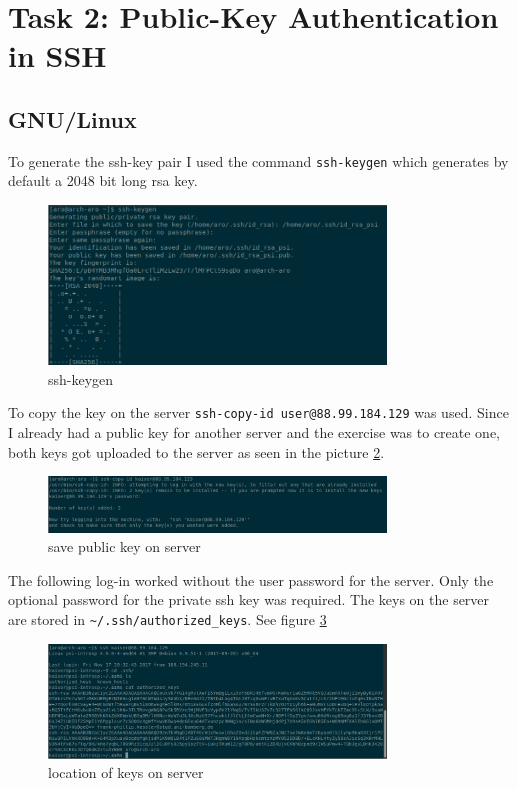 \section{Task 2: Public-Key Authentication in SSH}

\subsection{GNU/Linux}
To generate the ssh-key pair I used the command \verb|ssh-keygen| which generates by default a 2048 bit long rsa key. \\

\begin{figure}[H]
	\centering
	\includegraphics[width=0.8\textwidth]{Assignment0x01/image/ssh-keygen}
	\caption{ssh-keygen} \label{img:key-gen}
\end{figure}

To copy the key on the server \verb|ssh-copy-id user@88.99.184.129| was used. Since I already had a public key for another server and the exercise was to create one, both keys got uploaded to the server as seen in the picture \ref{img:ssh-copy-id}.

\begin{figure}[H]
	\centering
	\includegraphics[width=0.8\textwidth]{Assignment0x01/image/ssh-copy-id}
	\caption{save public key on server} \label{img:ssh-copy-id}
\end{figure}

The following log-in worked without the user password for the server. Only the optional password for the private ssh key was required. The keys on the server are stored in \verb|~/.ssh/authorized_keys|. See figure \ref{img:key_server}

\begin{figure}[H]
	\centering
	\includegraphics[width=0.8\textwidth]{Assignment0x01/image/ssh_login_key_path}
	\caption{location of keys on server} \label{img:key_server}
\end{figure}

